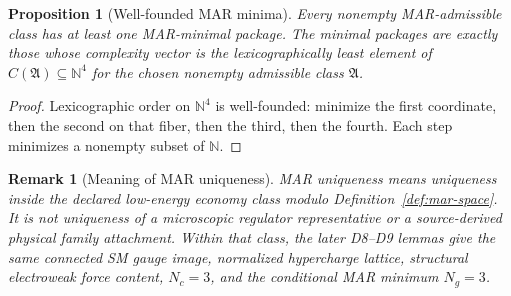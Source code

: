 \documentclass[11pt]{article}
\newtheorem{proposition}[theorem]{Proposition}
\newtheorem{remark}[theorem]{Remark}
\begin{document}
\begin{proposition}[Well-founded MAR minima]\label{prop:mar-well-founded}
Every nonempty MAR-admissible class has at least one MAR-minimal package. The minimal packages are exactly those whose complexity vector is the lexicographically least element of \(C(\mathfrak A)\subseteq\mathbb N^4\) for the chosen nonempty admissible class \(\mathfrak A\).
\end{proposition}

\begin{proof}
Lexicographic order on \(\mathbb N^4\) is well-founded: minimize the first coordinate, then the second on that fiber, then the third, then the fourth. Each step minimizes a nonempty subset of \(\mathbb N\).
\end{proof}

\begin{remark}[Meaning of MAR uniqueness]\label{rem:mar-uniqueness}
MAR uniqueness means uniqueness inside the declared low-energy economy class modulo Definition~\ref{def:mar-space}. It is not uniqueness of a microscopic regulator representative or a source-derived physical family attachment. Within that class, the later D8--D9 lemmas give the same connected SM gauge image, normalized hypercharge lattice, structural electroweak force content, \(N_c=3\), and the conditional MAR minimum \(N_g=3\).
\end{remark}
\end{document}
